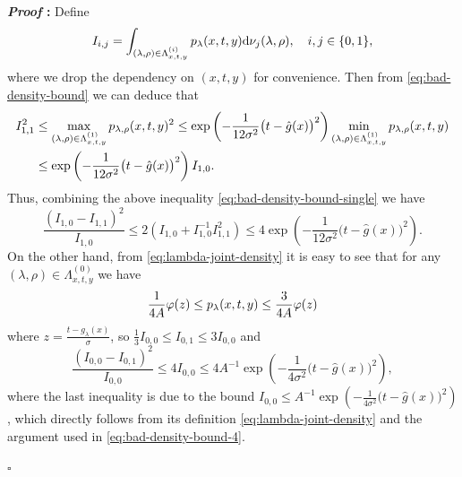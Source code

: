 \documentclass{article}
\newcommand{\dd}{\textup{d}}
\renewenvironment{proof}{\noindent\textbf{\textit{Proof }:}}{\hfill$\square$}
\begin{document}
\begin{proof}
    Define
    \begin{equation}
        \notag
        I_{i,j} = \int_{(\lambda,\rho)\in\Lambda_{x,t,y}^{(i)}} p_{\lambda}(x,t,y) \dd \nu_j(\lambda,\rho),\quad i,j\in\{0,1\},
    \end{equation}
    where we drop the dependency on $(x,t,y)$ for convenience.
    Then from \eqref{eq:bad-density-bound} we can deduce that
    \begin{equation}
        \notag
        \begin{aligned}
            I_{1,1}^2 &\leq \max_{(\lambda,\rho)\in\Lambda_{x,t,y}^{(1)}} p_{\lambda,\rho}(x,t,y)^2 \leq \exp\left(-\frac{1}{12\sigma^2}\big(t-\hat{g}(x)\big)^2\right) \min_{(\lambda,\rho)\in\Lambda_{x,t,y}^{(1)}} p_{\lambda,\rho}(x,t,y) \\
            &\leq \exp\left(-\frac{1}{12\sigma^2}\big(t-\hat{g}(x)\big)^2\right) I_{1,0}.
        \end{aligned}
    \end{equation}
    Thus, combining the above inequality \eqref{eq:bad-density-bound-single} we have
    \begin{equation}
        \label{eq:chi-square-bound-1}
        \frac{(I_{1,0}-I_{1,1})^2}{I_{1,0}} \leq 2\left(I_{1,0}+I_{1,0}^{-1}I_{1,1}^2\right) \leq 4\exp\left(-\frac{1}{12\sigma^2}\big(t-\hat{g}(x)\big)^2\right).
    \end{equation}
    On the other hand, from \eqref{eq:lambda-joint-density} it is easy to see that for any $(\lambda,\rho)\in\Lambda_{x,t,y}^{(0)}$ we have
    \begin{equation}
        \notag
        \frac{1}{4A}\varphi(z) \leq p_{\lambda}(x,t,y) \leq \frac{3}{4A}\varphi(z)
    \end{equation}
    where $z=\frac{t-g_{\lambda}(x)}{\sigma}$, so $\frac{1}{3}I_{0,0}\leq I_{0,1}\leq 3I_{0,0}$ and
    \begin{equation}
        \label{eq:chi-square-bound-2}
        \frac{(I_{0,0}-I_{0,1})^2}{I_{0,0}} \leq 4I_{0,0} \leq 4A^{-1}\exp\left(-\frac{1}{4\sigma^2}\big(t-\hat{g}(x)\big)^2\right),
    \end{equation}
    where the last inequality is due to the bound $I_{0,0}\leq A^{-1}\exp\left(-\frac{1}{4\sigma^2}\big(t-\hat{g}(x)\big)^2\right)$, which directly follows from its definition \eqref{eq:lambda-joint-density} and the argument used in \eqref{eq:bad-density-bound-4}.
    

\end{proof}
\end{document}
